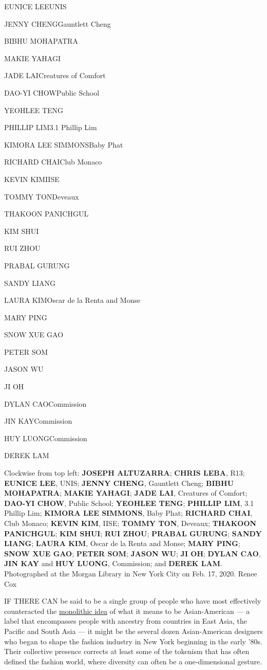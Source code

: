 EUNICE LEEUNIS

JENNY CHENGGauntlett Cheng

BIBHU MOHAPATRA

MAKIE YAHAGI

JADE LAICreatures of Comfort

DAO-YI CHOWPublic School

YEOHLEE TENG

PHILLIP LIM3.1 Phillip Lim

KIMORA LEE SIMMONSBaby Phat

RICHARD CHAIClub Monaco

KEVIN KIMIISE

TOMMY TONDeveaux

THAKOON PANICHGUL

KIM SHUI

RUI ZHOU

PRABAL GURUNG

SANDY LIANG

LAURA KIMOscar de la Renta and Monse

MARY PING

SNOW XUE GAO

PETER SOM

JASON WU

JI OH

DYLAN CAOCommission

JIN KAYCommission

HUY LUONGCommission

DEREK LAM

Clockwise from top left: \textbf{JOSEPH ALTUZARRA}; \textbf{CHRIS LEBA},
R13; \textbf{EUNICE LEE}, UNIS; \textbf{JENNY CHENG}, Gauntlett Cheng;
\textbf{BIBHU MOHAPATRA}; \textbf{MAKIE YAHAGI}; \textbf{JADE LAI},
Creatures of Comfort; \textbf{DAO-YI CHOW}, Public School;
\textbf{YEOHLEE TENG}; \textbf{PHILLIP LIM}, 3.1 Phillip Lim;
\textbf{KIMORA LEE SIMMONS}, Baby Phat; \textbf{RICHARD CHAI}, Club
Monaco; \textbf{KEVIN KIM}, IISE; \textbf{TOMMY TON}, Deveaux;
\textbf{THAKOON PANICHGUL}; \textbf{KIM SHUI}; \textbf{RUI ZHOU};
\textbf{PRABAL GURUNG}; \textbf{SANDY LIANG}; \textbf{LAURA KIM}, Oscar
de la Renta and Monse; \textbf{MARY PING}; \textbf{SNOW XUE GAO};
\textbf{PETER SOM}; \textbf{JASON WU}; \textbf{JI OH}; \textbf{DYLAN
CAO}, \textbf{JIN KAY} and \textbf{HUY LUONG}, Commission; and
\textbf{DEREK LAM}. Photographed at the Morgan Library in New York City
on Feb. 17, 2020. Renee Cox

IF THERE CAN be said to be a single group of people who have most
effectively counteracted the
\href{https://www.nytimes3xbfgragh.onion/2019/08/26/t-magazine/asian-american-comedians.html}{monolithic
idea} of what it means to be Asian-American --- a label that encompasses
people with ancestry from countries in East Asia, the Pacific and South
Asia --- it might be the several dozen Asian-American designers who
began to shape the fashion industry in New York beginning in the early
'80s. Their collective presence corrects at least some of the tokenism
that has often defined the fashion world, where diversity can often be a
one-dimensional gesture.

